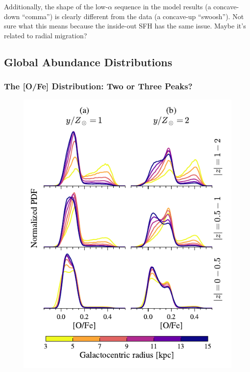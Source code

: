 \documentclass[twocolumn,twocolappendix,linenumbers]{aastex631}
\newcommand{\todo}[1]{{\color{red}#1}}
\begin{document}
Additionally, the shape of the low-$\alpha$ sequence in the model results (a concave-down ``comma'') is clearly different from the data (a concave-up ``swoosh''). \todo{Not sure what this means because the inside-out SFH has the same issue. Maybe it's related to radial migration?}

\subsection{Global Abundance Distributions}
\label{sec:disk-abundances}

\subsubsection{The [O/Fe] Distribution: Two or Three Peaks?}

\begin{figure}
    \centering
    \includegraphics[width=\linewidth]{src/tex/figures/ofe_distribution_yields.pdf}

\end{figure}
\end{document}
